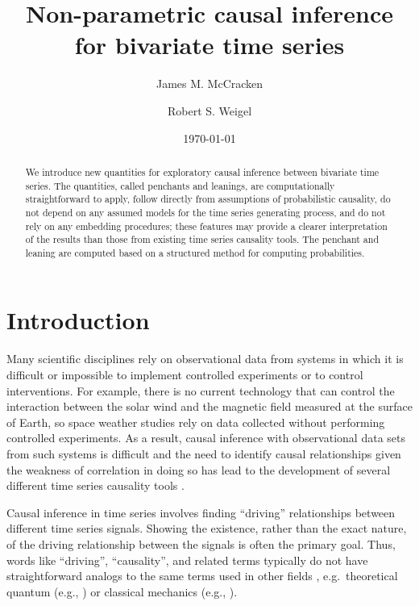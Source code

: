 \documentclass[twocolumn,aps,pre,groupedaddress]{revtex4-1}
\begin{document}
\title{Non-parametric causal inference for bivariate time series}
\author{James M. McCracken}
\author{Robert S. Weigel}
\date{\today}

\begin{abstract}
We introduce new quantities for exploratory causal inference between bivariate time series.  The quantities, called penchants and leanings, are computationally straightforward to apply, follow directly from assumptions of probabilistic causality, do not depend on any assumed models for the time series generating process, and do not rely on any embedding procedures; these features may provide a clearer interpretation of the results than those from existing time series causality tools.  The penchant and leaning are computed based on a structured method for computing probabilities.
\end{abstract}

\maketitle

\section{Introduction}
Many scientific disciplines rely on observational data from systems in which it is difficult or impossible to implement controlled experiments or to control interventions. For example, there is no current technology that can control the interaction between the solar wind and the magnetic field measured at the surface of Earth, so space weather studies rely on data collected without performing controlled experiments.  As a result, causal inference with observational data sets from such systems is difficult and the need to identify causal relationships given the weakness of correlation in doing so has lead to the development of several different time series causality tools \cite{Schreiber2000,granger1969,Rogosa1980,Pearl2000,kleinberg2012}.

Causal inference in time series involves finding ``driving'' relationships between different time series signals.  Showing the existence, rather than the exact nature, of the driving relationship between the signals is often the primary goal.  Thus, words like ``driving'', ``causality'', and related terms typically do not have straightforward analogs to the same terms used in other fields \cite{Granger1980,liu2012,Roberts1985}, e.g.\, theoretical quantum (e.g., \cite{Peres1995}) or classical mechanics (e.g., \cite{Bunge1979}).
\end{document}
